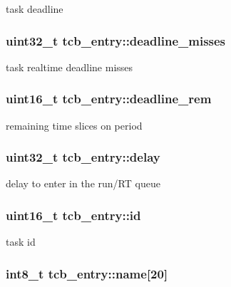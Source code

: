 task deadline \hypertarget{structtcb__entry_a4594d17577feba0bd0825c8ef5e693db}{
\subsubsection[{deadline\-\_\-misses}]{\setlength{\rightskip}{0pt plus 5cm}uint32\-\_\-t tcb\-\_\-entry\-::deadline\-\_\-misses}}\label{structtcb__entry_a4594d17577feba0bd0825c8ef5e693db}
task realtime deadline misses \hypertarget{structtcb__entry_af2ba0dde6c7ae71b6341714bf096cc80}{
\subsubsection[{deadline\-\_\-rem}]{\setlength{\rightskip}{0pt plus 5cm}uint16\-\_\-t tcb\-\_\-entry\-::deadline\-\_\-rem}}\label{structtcb__entry_af2ba0dde6c7ae71b6341714bf096cc80}
remaining time slices on period \hypertarget{structtcb__entry_ab29fad6168f140493ddc8f860fadc3bc}{
\subsubsection[{delay}]{\setlength{\rightskip}{0pt plus 5cm}uint32\-\_\-t tcb\-\_\-entry\-::delay}}\label{structtcb__entry_ab29fad6168f140493ddc8f860fadc3bc}
delay to enter in the run/\-R\-T queue \hypertarget{structtcb__entry_ac06c8d6513b9d3031956b0efc2ab4871}{
\subsubsection[{id}]{\setlength{\rightskip}{0pt plus 5cm}uint16\-\_\-t tcb\-\_\-entry\-::id}}\label{structtcb__entry_ac06c8d6513b9d3031956b0efc2ab4871}
task id \hypertarget{structtcb__entry_ad7bfcb0f4b58b797af44f3a078abebff}{
\subsubsection[{name}]{\setlength{\rightskip}{0pt plus 5cm}int8\-\_\-t tcb\-\_\-entry\-::name\mbox{[}20\mbox{]}}}\label{structtcb__entry_ad7bfcb0f4b58b797af44f3a078abebff}
